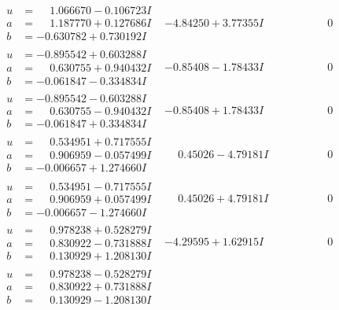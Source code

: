\documentclass[1p]{elsarticle_modified}
\theoremstyle{definition}
\begin{document}
$$\begin{array}{c|c|c}
\begin{aligned}
u &= \phantom{-}1.066670 - 0.106723 I \\
a &= \phantom{-}1.187770 + 0.127686 I \\
b &= -0.630782 + 0.730192 I\end{aligned}
 & -4.84250 + 3.77355 I & \phantom{-0.000000 } 0 \\ \hline\begin{aligned}
u &= -0.895542 + 0.603288 I \\
a &= \phantom{-}0.630755 + 0.940432 I \\
b &= -0.061847 - 0.334834 I\end{aligned}
 & -0.85408 - 1.78433 I & \phantom{-0.000000 } 0 \\ \hline\begin{aligned}
u &= -0.895542 - 0.603288 I \\
a &= \phantom{-}0.630755 - 0.940432 I \\
b &= -0.061847 + 0.334834 I\end{aligned}
 & -0.85408 + 1.78433 I & \phantom{-0.000000 } 0 \\ \hline\begin{aligned}
u &= \phantom{-}0.534951 + 0.717555 I \\
a &= \phantom{-}0.906959 - 0.057499 I \\
b &= -0.006657 + 1.274660 I\end{aligned}
 & \phantom{-}0.45026 - 4.79181 I & \phantom{-0.000000 } 0 \\ \hline\begin{aligned}
u &= \phantom{-}0.534951 - 0.717555 I \\
a &= \phantom{-}0.906959 + 0.057499 I \\
b &= -0.006657 - 1.274660 I\end{aligned}
 & \phantom{-}0.45026 + 4.79181 I & \phantom{-0.000000 } 0 \\ \hline\begin{aligned}
u &= \phantom{-}0.978238 + 0.528279 I \\
a &= \phantom{-}0.830922 - 0.731888 I \\
b &= \phantom{-}0.130929 + 1.208130 I\end{aligned}
 & -4.29595 + 1.62915 I & \phantom{-0.000000 } 0 \\ \hline\begin{aligned}
u &= \phantom{-}0.978238 - 0.528279 I \\
a &= \phantom{-}0.830922 + 0.731888 I \\
b &= \phantom{-}0.130929 - 1.208130 I\end{aligned}

\end{array}$$
\end{document}
